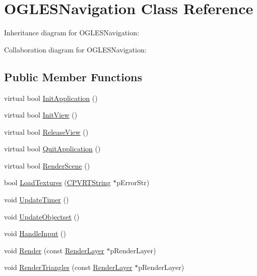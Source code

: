 \hypertarget{class_o_g_l_e_s_navigation}{\section{O\+G\+L\+E\+S\+Navigation Class Reference}
\label{class_o_g_l_e_s_navigation}
}


Inheritance diagram for O\+G\+L\+E\+S\+Navigation\+:


Collaboration diagram for O\+G\+L\+E\+S\+Navigation\+:
\subsection*{Public Member Functions}
\begin{DoxyCompactItemize}
\item 
virtual bool \hyperlink{class_o_g_l_e_s_navigation_a077baeb03a6b17c3efe03d0cfb4cd72b}{Init\+Application} ()
\item 
virtual bool \hyperlink{class_o_g_l_e_s_navigation_a33ac8658ee8a1d7f710a08208ae4f5e1}{Init\+View} ()
\item 
virtual bool \hyperlink{class_o_g_l_e_s_navigation_a40d03ff1f8d2aab1f555004eca059716}{Release\+View} ()
\item 
virtual bool \hyperlink{class_o_g_l_e_s_navigation_a34fbe53124c79f73cc560dd8dd821d28}{Quit\+Application} ()
\item 
virtual bool \hyperlink{class_o_g_l_e_s_navigation_a4d73567a360599959d26bf7ec08ab430}{Render\+Scene} ()
\item 
bool \hyperlink{class_o_g_l_e_s_navigation_a1bc8126d198cb9d9e96ed97e703f4406}{Load\+Textures} (\hyperlink{class_c_p_v_r_t_string}{C\+P\+V\+R\+T\+String} $\ast$p\+Error\+Str)
\item 
void \hyperlink{class_o_g_l_e_s_navigation_a3817dbee47d6cd218598a32094cd7fb6}{Update\+Timer} ()
\item 
void \hyperlink{class_o_g_l_e_s_navigation_ae02872b1254fea3eef0c89f904e3d602}{Update\+Objectset} ()
\item 
void \hyperlink{class_o_g_l_e_s_navigation_ad5d777eaa6c34b3d57cd03c5cc4da12c}{Handle\+Input} ()
\item 
void \hyperlink{class_o_g_l_e_s_navigation_ac58c075250528b934c91089a0055bb02}{Render} (const \hyperlink{struct_render_layer}{Render\+Layer} $\ast$p\+Render\+Layer)
\item 
void \hyperlink{class_o_g_l_e_s_navigation_af690367bda054e63fa94a0feb54d66b9}{Render\+Triangles} (const \hyperlink{struct_render_layer}{Render\+Layer} $\ast$p\+Render\+Layer)

\end{DoxyCompactItemize}
